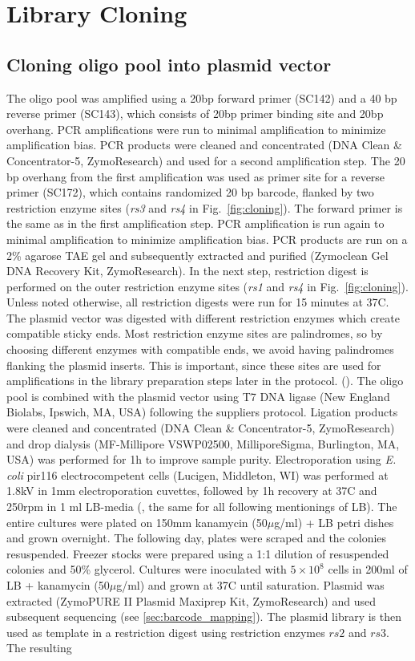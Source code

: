 \section{Library Cloning}
\subsection{Cloning oligo pool into plasmid vector}
\label{sec:library_cloning}
The oligo pool was amplified using a 20bp forward primer (SC142) and a 40 bp reverse primer (SC143), which consists of 20bp primer binding site and 20bp overhang. PCR amplifications were run to minimal amplification to minimize amplification bias. PCR products were cleaned and concentrated (DNA Clean \& Concentrator-5, ZymoResearch) and used for a second amplification step. The 20 bp overhang from the first amplification was used as primer site for a reverse primer (SC172), which contains randomized 20 bp barcode, flanked by two restriction enzyme sites (\textit{rs3} and \textit{rs4} in Fig.~\ref{fig:cloning}). The forward primer is the same as in the first amplification step. PCR amplification is run again to minimal amplification to minimize amplification bias. PCR products are run on a 2\% agarose TAE gel and subsequently extracted and purified (Zymoclean Gel DNA Recovery Kit, ZymoResearch). In the next step, restriction digest is performed on the outer restriction enzyme sites (\textit{rs1} and \textit{rs4} in Fig.~\ref{fig:cloning}). Unless noted otherwise, all restriction digests were run for 15 minutes at 37C. The plasmid vector was digested with different restriction enzymes which create compatible sticky ends. Most restriction enzyme sites are palindromes, so by choosing different enzymes with compatible ends, we avoid having palindromes flanking the plasmid inserts. This is important, since these sites are used for amplifications in the library preparation steps later in the protocol. (). The oligo pool is combined with the plasmid vector using T7 DNA ligase (New England Biolabs, Ipswich, MA, USA) following the suppliers protocol. Ligation products were cleaned and concentrated (DNA Clean \& Concentrator-5, ZymoResearch) and drop dialysis (MF-Millipore VSWP02500, MilliporeSigma, Burlington, MA, USA)  was performed for 1h to improve sample purity. Electroporation using \textit{E. coli} pir116 electrocompetent cells (Lucigen, Middleton, WI) was performed at 1.8kV in 1mm electroporation cuvettes, followed by 1h recovery at 37C and 250rpm in 1 ml LB-media (, the same for all following mentionings of LB). The entire cultures were plated on 150mm kanamycin (50$\mu$g/ml) + LB petri dishes and grown overnight. The following day, plates were scraped and the colonies resuspended. Freezer stocks were prepared using a 1:1 dilution of resuspended colonies and 50\% glycerol. Cultures were inoculated with $5\times 10^8$ cells in 200ml of LB + kanamycin (50$\mu$g/ml) and grown at 37C until saturation. Plasmid was extracted (ZymoPURE II Plasmid Maxiprep Kit, ZymoResearch) and used subsequent sequencing (see \ref{sec:barcode_mapping}). The plasmid library is then used as template in a restriction digest using restriction enzymes $rs2$ and $rs3$. The resulting 